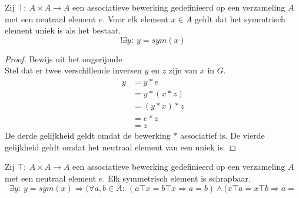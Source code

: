 \documentclass[main.tex]{subfiles}
\begin{document}
\begin{st}
  \label{st:invers-element-uniek}
  Zij $\top:\ A\times A\rightarrow A$ een associatieve bewerking gedefinieerd op een verzameling $A$ met een neutraal element $e$.
  Voor elk element $x \in A$ geldt dat het symmtrisch element uniek is als het bestaat.
  \[ !\exists y:\ y = sym(x) \]
  \begin{proof}
    Bewijs uit het ongerijmde\\
    Stel dat er twee verschillende inversen $y$ en $z$ zijn van $x$ in $G$.
    \[  
    \begin{array}{rl}
      y &= y * e\\
      &= y * (x * z)\\
      &= (y * x) * z\\
      &= e * z\\
      &= z
    \end{array}
    \]
    De derde gelijkheid geldt omdat de bewerking $*$ associatief is.
    De vierde gelijkheid geldt omdat het neutraal element van een uniek is.
  \end{proof}
\end{st}

\begin{st}
  \label{st:symmetrisch-element-schrapbaar}
  Zij $\top:\ A\times A\rightarrow A$ een associatieve bewerking gedefinieerd op een verzameling $A$ met een neutraal element $e$.
  Elk symmetrisch element is schrapbaar.
  \[ \exists y:\ y = sym(x) \Rightarrow (\forall a,b \in A:\ (a\top x = b \top x \Rightarrow a = b) \wedge( x\top a = x \top b \Rightarrow a = \]
\end{st}
\end{document}
